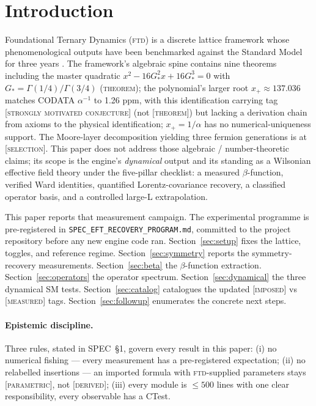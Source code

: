 \documentclass[11pt,letterpaper]{article}
\newcommand{\Gstar}{G_{\!*}}
\newcommand{\FTD}{\textsc{ftd}}
\begin{document}
\section{Introduction}
\label{sec:intro}

Foundational Ternary Dynamics (\FTD) is a discrete lattice framework
whose phenomenological outputs have been benchmarked against the Standard
Model for three years \cite{FTDSpec, CompleteSM}. The framework's
algebraic spine \cite{SpecAlgebraicSpine} contains nine theorems
including the master quadratic
$x^2 - 16\Gstar^2 x + 16\Gstar^3 = 0$ with $\Gstar = \Gamma(1/4)/\Gamma(3/4)$
(\textsc{theorem}); the polynomial's larger root $x_+ \approx 137.036$
matches CODATA $\alpha^{-1}$ to 1.26 ppm, with this
identification carrying tag [\textsc{strongly motivated conjecture}]
(not [\textsc{theorem}]) but lacking a derivation chain from axioms to
the physical identification; $x_+ = 1/\alpha$ has no numerical-uniqueness
support. The Moore-layer decomposition yielding
three fermion generations \cite{MooreLayer} is at [\textsc{selection}].
This paper does not address those algebraic / number-theoretic claims;
its scope is the engine's \emph{dynamical} output and its standing as
a Wilsonian effective field theory under the five-pillar checklist:
a measured $\beta$-function, verified Ward identities, quantified
Lorentz-covariance recovery, a classified operator basis, and a controlled
large-L extrapolation.

This paper reports that measurement campaign. The experimental programme
is pre-registered in \texttt{SPEC\_EFT\_RECOVERY\_PROGRAM.md}, committed
to the project repository before any new engine code ran. Section~\ref{sec:setup}
fixes the lattice, toggles, and reference regime. Section~\ref{sec:symmetry}
reports the symmetry-recovery measurements. Section~\ref{sec:beta} the
$\beta$-function extraction. Section~\ref{sec:operators} the operator
spectrum. Section~\ref{sec:dynamical} the three dynamical SM tests.
Section~\ref{sec:catalog} catalogues the updated [\textsc{imposed}] vs
[\textsc{measured}] tags. Section~\ref{sec:followup} enumerates the
concrete next steps.

\paragraph{Epistemic discipline.} Three rules, stated in SPEC~\S1, govern
every result in this paper: (i) no numerical fishing --- every measurement
has a pre-registered expectation; (ii) no relabelled insertions --- an
imported formula with \FTD-supplied parameters stays
[\textsc{parametric}], not [\textsc{derived}]; (iii) every module is
$\leq 500$ lines with one clear responsibility, every observable has a
CTest.
\end{document}
